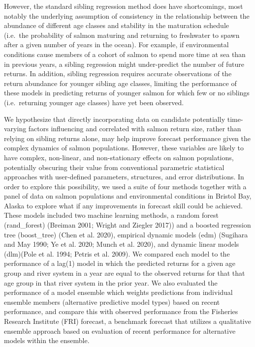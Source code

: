 \documentclass[
]{article}
\begin{document}
However, the standard sibling regression method does have shortcomings, most notably the underlying assumption of consistency in the relationship between the abundance of different age classes and stability in the maturation schedule (i.e.~the probability of salmon maturing and returning to freshwater to spawn after a given number of years in the ocean). For example, if environmental conditions cause members of a cohort of salmon to spend more time at sea than in previous years, a sibling regression might under-predict the number of future returns. In addition, sibling regression requires accurate observations of the return abundance for younger sibling age classes, limiting the performance of these models in predicting returns of younger salmon for which few or no siblings (i.e.~returning younger age classes) have yet been observed.

We hypothesize that directly incorporating data on candidate potentially time-varying factors influencing and correlated with salmon return size, rather than relying on sibling returns alone, may help improve forecast performance given the complex dynamics of salmon populations. However, these variables are likely to have complex, non-linear, and non-stationary effects on salmon populations, potentially obscuring their value from conventional parametric statistical approaches with user-defined parameters, structures, and error distributions. In order to explore this possibility, we used a suite of four methods together with a panel of data on salmon populations and environmental conditions in Bristol Bay, Alaska to explore what if any improvements in forecast skill could be achieved. These models included two machine learning methods, a random forest (rand\_forest) (Breiman 2001; Wright and Ziegler 2017)) and a boosted regression tree (boost\_tree) (Chen et al. 2020), empirical dynamic models (edm) (Sugihara and May 1990; Ye et al. 2020; Munch et al. 2020), and dynamic linear models (dlm)(Pole et al. 1994; Petris et al. 2009). We compared each model to the performance of a lag(1) model in which the predicted returns for a given age group and river system in a year are equal to the observed returns for that that age group in that river system in the prior year. We also evaluated the performance of a model ensemble which weights predictions from individual ensemble members (alternative predictive model types) based on recent performance, and compare this with observed performance from the Fisheries Research Institute (FRI) forecast, a benchmark forecast that utilizes a qualitative ensemble approach based on evaluation of recent performance for alternative models within the ensemble.
\end{document}
